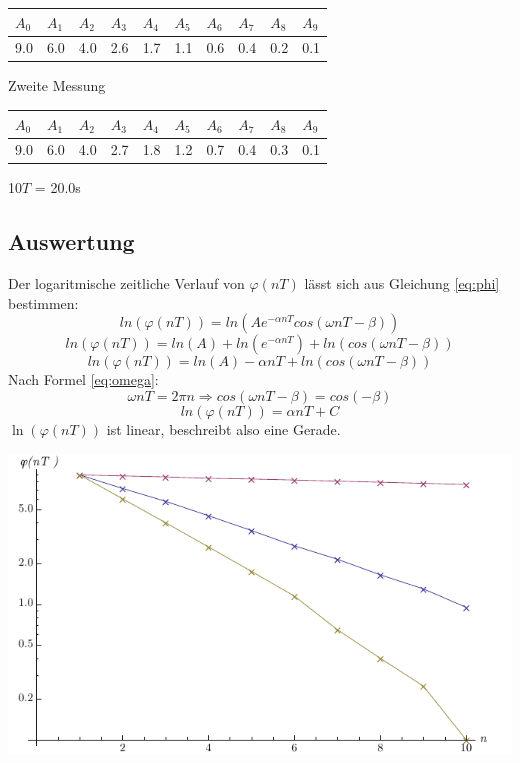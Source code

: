 \documentclass[12pt,a4paper]{article}
\begin{document}
\begin{tabular}{|l|l|l|l|l|l|l|l|l|l|}
\hline
$A_{0}$&$A_{1}$&$A_{2}$&$A_{3}$&$A_{4}$&$A_{5}$&$A_{6}$&$A_{7}$&$A_{8}$&$A_{9}$\\
\hline
9.0&6.0&4.0&2.6&1.7&1.1&0.6&0.4&0.2&0.1\\
\hline
\end{tabular}
\vspace{10pt}

Zweite Messung

\vspace{3pt}
\begin{tabular}{|l|l|l|l|l|l|l|l|l|l|}
\hline
$A_{0}$&$A_{1}$&$A_{2}$&$A_{3}$&$A_{4}$&$A_{5}$&$A_{6}$&$A_{7}$&$A_{8}$&$A_{9}$\\
\hline
9.0&6.0&4.0&2.7&1.8&1.2&0.7&0.4&0.3&0.1\\
\hline
\end{tabular}

\vspace{10pt}
10$T$ = 20.0s

\subsection*{Auswertung}
Der logaritmische zeitliche Verlauf von $\varphi(nT)$ l\"asst sich aus Gleichung \ref{eq:phi} bestimmen:
\[ ln(\varphi(nT)) = ln(Ae^{-\alpha nT}cos(\omega nT - \beta)) \]
\[ ln(\varphi(nT)) = ln(A) + ln(e^{-\alpha nT}) + ln(cos(\omega nT - \beta)) \]
\[ ln(\varphi(nT)) = ln(A) -\alpha nT + ln(cos(\omega nT - \beta)) \]
Nach Formel \ref{eq:omega}:
\[ \omega nT = 2\pi n \Rightarrow cos(\omega nT - \beta) = cos(- \beta) \]
\[ ln(\varphi(nT)) = \alpha nT + C \]
$\ln(\varphi(nT))$ ist linear, beschreibt also eine Gerade.

\includegraphics[width=15cm]{plot1.pdf}
\end{document}
